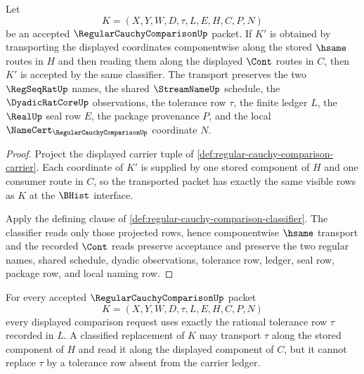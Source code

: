 \begin{theorem}
\label{thm:regular-cauchy-comparison-classifier-transport}
Let
$$
K=(X,Y,W,D,\tau,L,E,H,C,P,N)
$$
be an accepted $\RegularCauchyComparisonUp$ packet. If $K'$ is obtained by transporting the displayed coordinates componentwise along the stored $\hsame$ routes in $H$ and then reading them along the displayed $\Cont$ routes in $C$, then $K'$ is accepted by the same classifier. The transport preserves the two $\RegSeqRatUp$ names, the shared $\StreamNameUp$ schedule, the $\DyadicRatCoreUp$ observations, the tolerance row $\tau$, the finite ledger $L$, the $\RealUp$ seal row $E$, the package provenance $P$, and the local $\NameCert_{\RegularCauchyComparisonUp}$ coordinate $N$.
\end{theorem}

\begin{proof}
Project the displayed carrier tuple of \autoref{def:regular-cauchy-comparison-carrier}. Each coordinate of $K'$ is supplied by one stored component of $H$ and one consumer route in $C$, so the transported packet has exactly the same visible rows as $K$ at the $\BHist$ interface.

Apply the defining clause of \autoref{def:regular-cauchy-comparison-classifier}. The classifier reads only those projected rows, hence componentwise $\hsame$ transport and the recorded $\Cont$ reads preserve acceptance and preserve the two regular names, shared schedule, dyadic observations, tolerance row, ledger, seal row, package row, and local naming row.
\end{proof}

\begin{theorem}
\label{thm:regular-cauchy-comparison-tolerance-row-stability}
For every accepted $\RegularCauchyComparisonUp$ packet
$$
K=(X,Y,W,D,\tau,L,E,H,C,P,N)
$$
every displayed comparison request uses exactly the rational tolerance row $\tau$ recorded in $L$. A classified replacement of $K$ may transport $\tau$ along the stored component of $H$ and read it along the displayed component of $C$, but it cannot replace $\tau$ by a tolerance row absent from the carrier ledger.
\end{theorem}

